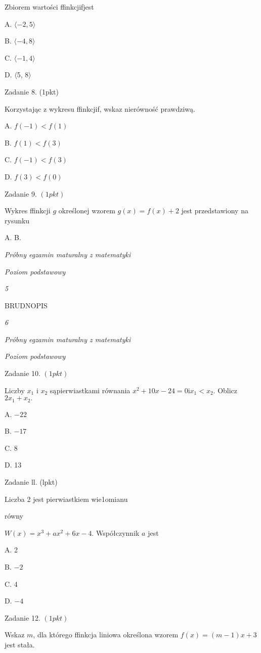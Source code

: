 \documentclass[a4paper,12pt]{article}
\begin{document}
Zbiorem wartości ffinkcjifjest

A. $\langle-2,5\rangle$

B. $\langle-4,8\rangle$

C. $\langle-1,4\rangle$

D. $\langle$5, $ 8\rangle$

Zadanie 8. (1pkt)

Korzystając z wykresu ffinkcjif, wskaz nierówność prawdziwą.

A. $f(-1)<f(1)$

B. $f(1)<f(3)$

C. $f(-1)<f(3)$

D. $f(3)<f(0)$

Zadanie 9. $(1pkt)$

Wykres ffinkcji $g$ określonej wzorem $g(x)=f(x)+2$ jest przedstawiony na rysunku

A. B.





{\it Próbny egzamin maturalny z matematyki}

{\it Poziom podstawowy}

{\it 5}

BRUDNOPIS





{\it 6}

{\it Próbny egzamin maturalny z matematyki}

{\it Poziom podstawowy}

Zadanie 10. $(1pkt)$

Liczby $x_{1}$ i $x_{2}$ sąpierwiastkami równania $x^{2}+10x-24=0\mathrm{i}x_{1}<x_{2}$. Oblicz $2x_{1}+x_{2}.$

A. $-22$

B. $-17$

C. 8

D. 13

Zadanie ll. (lpkt)

Liczba 2 jest pierwiastkiem wie1omianu

równy

$W(x)=x^{3}+ax^{2}+6x-4$. Współczynnik $a$ jest

A. 2

B. $-2$

C. 4

D. $-4$

Zadanie 12. $(1pkt)$

Wskaz $m$, dla którego ffinkcja liniowa określona wzorem $f(x)=(m-1)x+3$ jest stała.
\end{document}
